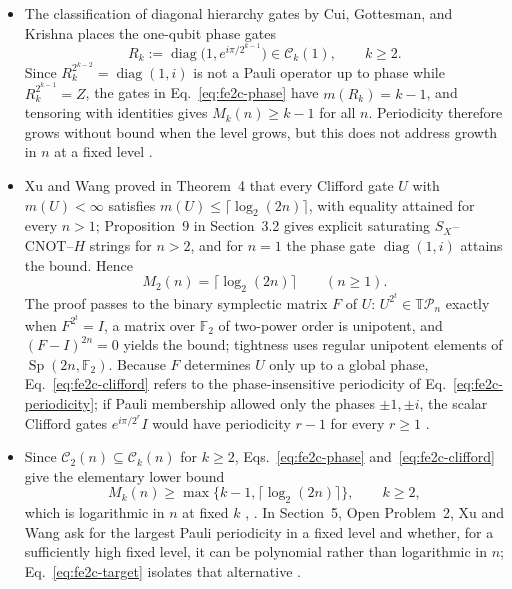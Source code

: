 \begin{itemize}
  \item The classification of diagonal hierarchy gates by Cui, Gottesman, and
  Krishna places the one-qubit phase gates
  \begin{equation}
    R_k:=\operatorname{diag}\bigl(1,e^{i\pi/2^{k-1}}\bigr)\in\mathcal{C}_k(1),
    \qquad k\geq2.
    \label{eq:fe2c-phase}
  \end{equation}
  Since $R_k^{2^{k-2}}=\operatorname{diag}(1,i)$ is not a Pauli operator up to
  phase while $R_k^{2^{k-1}}=Z$, the gates in Eq.~\eqref{eq:fe2c-phase} have
  $m(R_k)=k-1$, and tensoring with identities gives $M_k(n)\geq k-1$ for all
  $n$.  Periodicity therefore grows without bound when the level grows, but this
  does not address growth in $n$ at a fixed level
  .

  \item Xu and Wang proved in Theorem~4 that every Clifford gate $U$ with
  $m(U)<\infty$ satisfies $m(U)\leq\lceil\log_2(2n)\rceil$, with equality
  attained for every $n>1$; Proposition~9 in Section~3.2 gives explicit
  saturating $S_X$--CNOT--$H$ strings for $n>2$, and for $n=1$ the phase gate
  $\operatorname{diag}(1,i)$ attains the bound.  Hence
  \begin{equation}
    M_2(n)=\lceil\log_2(2n)\rceil\qquad(n\geq1).
    \label{eq:fe2c-clifford}
  \end{equation}
  The proof passes to the binary symplectic matrix $F$ of $U$:
  $U^{2^t}\in\mathbb{T}\mathcal{P}_n$ exactly when $F^{2^t}=I$, a matrix over
  $\mathbb{F}_2$ of two-power order is unipotent, and $(F-I)^{2n}=0$ yields the
  bound; tightness uses regular unipotent elements of
  $\operatorname{Sp}(2n,\mathbb{F}_2)$.  Because $F$ determines $U$ only up to a
  global phase, Eq.~\eqref{eq:fe2c-clifford} refers to the phase-insensitive
  periodicity of Eq.~\eqref{eq:fe2c-periodicity}; if Pauli membership allowed
  only the phases $\pm1,\pm i$, the scalar Clifford gates $e^{i\pi/2^{r}}I$
  would have periodicity $r-1$ for every $r\geq1$
  .

  \item Since $\mathcal{C}_2(n)\subseteq\mathcal{C}_k(n)$ for $k\geq2$,
  Eqs.~\eqref{eq:fe2c-phase} and~\eqref{eq:fe2c-clifford} give the elementary
  lower bound
  \begin{equation}
    M_k(n)\geq\max\bigl\{k-1,\lceil\log_2(2n)\rceil\bigr\},
    \qquad k\geq2,
    \label{eq:fe2c-lower}
  \end{equation}
  which is logarithmic in $n$ at fixed $k$
  , .  In
  Section~5, Open Problem~2, Xu and Wang ask for the largest Pauli periodicity
  in a fixed level and whether, for a sufficiently high fixed level, it can be
  polynomial rather than logarithmic in $n$; Eq.~\eqref{eq:fe2c-target} isolates
  that alternative .


\end{itemize}
